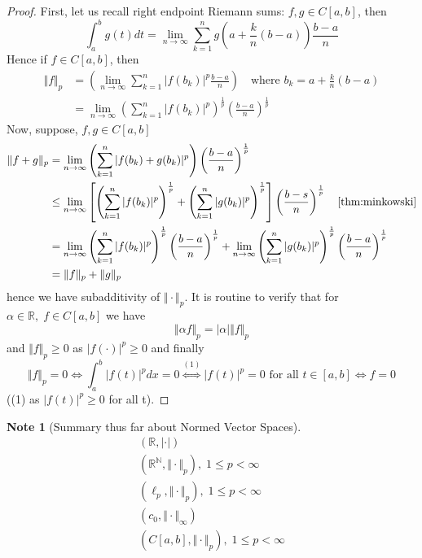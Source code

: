 \documentclass[11pt, oneside]{book}
\theoremstyle{break}
\newtheorem*{proof}{Proof}
\newtheorem*{note}{Note}
\newcommand{\bb}[1]{\mathbb{#1}}			%
\begin{document}
\begin{proof}
	First, let us recall right endpoint Riemann sums: $f, g \in C[a,b]$, then
	\begin{equation}
		\int_{a}^{b} g(t) dt = \lim_{n \to \infty} \sum_{k=1}^{n} g \left(a + \frac{k}{n} (b - a) \right)\frac{b-a}{n}
	\end{equation}
	Hence if $f \in C[a,b]$, then
	\begin{align*}
		\Vert f\Vert _p &= \left( \lim_{n \to \infty} \sum_{k=1}^{n} |f(b_k)|^p \frac{b-a}{n}  \right) \quad \text{where } b_k = a + \frac{k}{n} (b - a) \\
			&= \lim_{n \to \infty} \left(\sum_{k=1}^{n} |f(b_k)|^p \right)^{\frac{1}{p}} \left( \frac{b-a}{n} \right)^{\frac{1}{p}}
	\end{align*}
	Now, suppose, $f, g \in C[a,b]$
	\begin{align*}
		\Vert f + g\Vert _p &= \lim_{n \to \infty} \left( \sum_{k=1}^{n} |f(b_k) + g(b_k)|^p \right) \left(\frac{b-a}{n} \right)^{\frac{1}{p}} \\
			&\leq \lim_{n \to \infty} \left[ \left(\sum_{k=1}^{n} |f(b_k)|^p \right)^{\frac{1}{p}} + \left(\sum_{k=1}^{n} |g(b_k)|^p \right)^{\frac{1}{p}} \right] \left( \frac{b-s}{n} \right)^{\frac{1}{p}} \quad \autoref{thm:minkowski} \\
			&= \lim_{n \to \infty} \left(\sum_{k=1}^{n} |f(b_k)|^p \right)^{\frac{1}{p}} \left( \frac{b-a}{n} \right)^{\frac{1}{p}} + \lim_{n \to \infty} \left(\sum_{k=1}^{n} |g(b_k)|^p \right)^{\frac{1}{p}} \left( \frac{b-a}{n} \right)^{\frac{1}{p}} \\
			&= \Vert f\Vert _p + \Vert g\Vert _p
	\end{align*}
	hence we have subadditivity of $\Vert \cdot\Vert _p$. It is routine to verify that for $\alpha \in \bb{R}, \; f \in C[a,b]$ we have
	\begin{equation}
		\Vert \alpha f \Vert_p = |\alpha|\Vert f\Vert _p
	\end{equation}
	and $\Vert f\Vert _p \geq 0$ as $|f(\cdot)|^p \geq 0$ and finally
	\begin{equation}
		\Vert f\Vert _p = 0 \iff \int_{a}^{b} |f(t)|^p dx = 0 \overset{(1)}{\iff} |f(t)|^p = 0 \text{ for all } t \in [a,b] \iff f = 0
	\end{equation}
	((1) as $|f(t)|^p \geq 0$ for all t).
\end{proof}

\begin{note}[Summary thus far about Normed Vector Spaces]
	\begin{gather*}
		(\bb{R}, |\cdot|) \\
		(\bb{R}^\bb{N}, \Vert \cdot\Vert _p), \; 1 \leq p < \infty \\
		(\ell_p, \Vert \cdot\Vert _p), \; 1 \leq p < \infty \\
		(c_0, \Vert \cdot\Vert _\infty) \\
		(C[a,b], \Vert \cdot\Vert _p), \; 1 \leq p < \infty
	\end{gather*}
\end{note}
\end{document}

